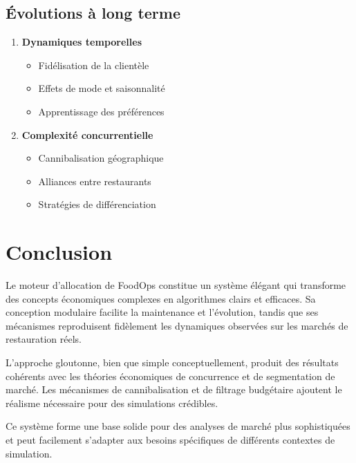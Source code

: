 \documentclass[12pt,a4paper]{article}
\begin{document}
\subsection{Évolutions à long terme}

\begin{enumerate}
    \item \textbf{Dynamiques temporelles}
    \begin{itemize}
        \item Fidélisation de la clientèle
        \item Effets de mode et saisonnalité
        \item Apprentissage des préférences
    \end{itemize}

    \item \textbf{Complexité concurrentielle}
    \begin{itemize}
        \item Cannibalisation géographique
        \item Alliances entre restaurants
        \item Stratégies de différenciation
    \end{itemize}
\end{enumerate}

\section{Conclusion}

Le moteur d'allocation de FoodOps constitue un système élégant qui transforme des concepts économiques complexes en algorithmes clairs et efficaces. Sa conception modulaire facilite la maintenance et l'évolution, tandis que ses mécanismes reproduisent fidèlement les dynamiques observées sur les marchés de restauration réels.

L'approche gloutonne, bien que simple conceptuellement, produit des résultats cohérents avec les théories économiques de concurrence et de segmentation de marché. Les mécanismes de cannibalisation et de filtrage budgétaire ajoutent le réalisme nécessaire pour des simulations crédibles.

Ce système forme une base solide pour des analyses de marché plus sophistiquées et peut facilement s'adapter aux besoins spécifiques de différents contextes de simulation.
\end{document}
